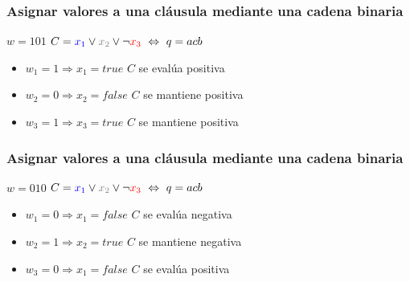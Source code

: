 \documentclass{beamer}
\begin{document}
\begin{frame}
    \frametitle{Asignar valores a una cláusula mediante una cadena binaria}
    
    \begin{center}
        \begin{Large}
            $w=101$ \hspace{1cm} $C=\textcolor{blue}{x_1}\vee \textcolor{gray}{x_2}\vee \neg \textcolor{red}{x_3}\ \Leftrightarrow\ q=acb$
        \end{Large}
    \end{center}
    
    \pause
    \vspace{1cm}
    
    \begin{itemize}
        \item $w_1=1\Rightarrow x_1=true$ $C$ se evalúa positiva
              \pause
        \item $w_2=0\Rightarrow x_2=false$ $C$ se mantiene positiva
              \pause
        \item $w_3=1\Rightarrow x_3=true$ $C$ se mantiene positiva
              
    \end{itemize}
\end{frame}
\begin{frame}
    \frametitle{Asignar valores a una cláusula mediante una cadena binaria}
    
    \begin{center}
        \begin{Large}
            $w=010$ \hspace{1cm} $C=\textcolor{blue}{x_1}\vee \textcolor{gray}{x_2}\vee \neg \textcolor{red}{x_3}\ \Leftrightarrow\ q=acb$
        \end{Large}
    \end{center}
    
    \pause
    \vspace{1cm}
    
    
    \begin{itemize}
        \item $w_1=0\Rightarrow x_1=false$ $C$ se evalúa negativa
              \pause
        \item $w_2=1\Rightarrow x_2=true$ $C$ se mantiene negativa
              \pause
        \item $w_3=0\Rightarrow x_1=false$ $C$ se evalúa positiva
              
    \end{itemize}
\end{frame}
\end{document}
